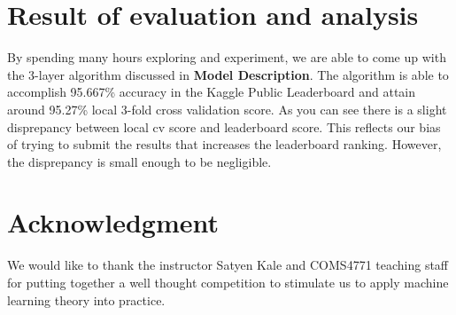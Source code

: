 \documentclass[conference]{IEEEtran}
\begin{document}
\section{Result of evaluation and analysis}
By spending many hours exploring and experiment, we are able to come up with the 3-layer algorithm discussed in \textbf{Model Description}. The algorithm is able to accomplish 95.667\% accuracy in the Kaggle Public Leaderboard and attain around 95.27\% local 3-fold cross validation score. As you can see there is a slight disprepancy between local cv score and leaderboard score. This reflects our bias of trying to submit the results that increases the leaderboard ranking. However, the disprepancy is small enough to be negligible.


\section*{Acknowledgment}
We would like to thank the instructor Satyen Kale and COMS4771 teaching staff for putting together a well thought competition to stimulate us to apply machine learning theory into practice.







%
%
%



\end{document}
